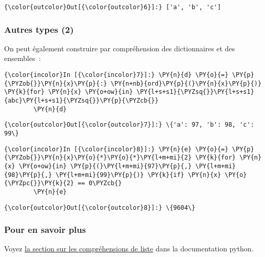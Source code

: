 \begin{Verbatim}[commandchars=\\\{\}]
{\color{outcolor}Out[{\color{outcolor}6}]:} ['a', 'b', 'c']
\end{Verbatim}
            
    \hypertarget{autres-types-2}{%
\subsubsection{Autres types (2)}\label{autres-types-2}}

    On peut également construire par compréhension des dictionnaires et des
ensembles~:

    \begin{Verbatim}[commandchars=\\\{\}]
{\color{incolor}In [{\color{incolor}7}]:} \PY{n}{d} \PY{o}{=} \PY{p}{\PYZob{}}\PY{n}{x}\PY{p}{:} \PY{n+nb}{ord}\PY{p}{(}\PY{n}{x}\PY{p}{)} \PY{k}{for} \PY{n}{x} \PY{o+ow}{in} \PY{l+s+s1}{\PYZsq{}}\PY{l+s+s1}{abc}\PY{l+s+s1}{\PYZsq{}}\PY{p}{\PYZcb{}}
        \PY{n}{d}
\end{Verbatim}


\begin{Verbatim}[commandchars=\\\{\}]
{\color{outcolor}Out[{\color{outcolor}7}]:} \{'a': 97, 'b': 98, 'c': 99\}
\end{Verbatim}
            
    \begin{Verbatim}[commandchars=\\\{\}]
{\color{incolor}In [{\color{incolor}8}]:} \PY{n}{e} \PY{o}{=} \PY{p}{\PYZob{}}\PY{n}{x}\PY{o}{*}\PY{o}{*}\PY{l+m+mi}{2} \PY{k}{for} \PY{n}{x} \PY{o+ow}{in} \PY{p}{(}\PY{l+m+mi}{97}\PY{p}{,} \PY{l+m+mi}{98}\PY{p}{,} \PY{l+m+mi}{99}\PY{p}{)} \PY{k}{if} \PY{n}{x} \PY{o}{\PYZpc{}}\PY{k}{2} == 0\PYZcb{}
        \PY{n}{e}
\end{Verbatim}


\begin{Verbatim}[commandchars=\\\{\}]
{\color{outcolor}Out[{\color{outcolor}8}]:} \{9604\}
\end{Verbatim}
            
    \hypertarget{pour-en-savoir-plus}{%
\subsubsection{Pour en savoir plus}\label{pour-en-savoir-plus}}

    Voyez
\href{https://docs.python.org/3/tutorial/datastructures.html\#list-comprehensions}{la
section sur les compréhensions de liste} dans la documentation python.


    
    
    
